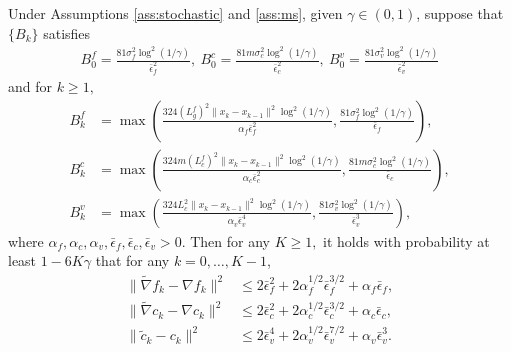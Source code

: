 \documentclass[10pt,a4paper]{amsart}
\newcommand{\be}{\begin{equation}}
\newcommand{\ee}{\end{equation}}
\begin{document}
\begin{lemma}\label{lem:gradient_estimator_recursive_lemma}
Under Assumptions \ref{ass:stochastic} and \ref{ass:ms}, given \(\gamma \in (0,1)\), suppose that $\{B_k\}$ satisfies 
\begin{align}\label{rm_b0}
    B_0^f =  \frac{81\sigma_f^2\log^2(1 /\gamma)}{\bar \epsilon_f^2},~ B_0^c =  \frac{{81m\sigma_c^2\log^2(1 /\gamma)}}{\bar \epsilon_c^2},~ B_0^v =  \frac{81\sigma_v^2\log^2(1 /\gamma)}{\bar \epsilon_v^2} 
\end{align}
and for $k\ge1,$
\be\label{batch-rm}\begin{aligned}
    B_k^f &= \max \left(\frac{324(L_g^f)^2\|x_k - x_{k-1}\|^2\log^2(1/\gamma)}{\alpha_f\bar \epsilon_f^2},\frac{81\sigma_f^2\log^2(1/\gamma)}{\bar \epsilon_f}\right) , \\
    B_k^c &= \max \left(\frac{{324 m (L_c^f)^2\|x_k - x_{k-1}\|^2\log^2(1/\gamma)}}{\alpha_c\bar \epsilon_c^2},\frac{{81m\sigma_c^2\log^2(1/\gamma)}}{\bar \epsilon_c}\right) , \\
    B_k^v &= \max \left(\frac{324 L_c^2\|x_k - x_{k-1}\|^2\log^2(1/\gamma)}{\alpha_v\bar \epsilon_v^4},\frac{81\sigma_v^2\log^2(1/\gamma)}{\bar \epsilon_v^3}\right) ,
\end{aligned}\ee
where $\alpha_f,\alpha_c,\alpha_v,\bar \epsilon_f,\bar \epsilon_c,\bar \epsilon_v>0$. Then for any $K\ge 1,$ it holds with probability at least $1-6K\gamma$ that for any \(k=0,\ldots, K-1\),
    \be\label{hig-err}\begin{aligned}
        \|\tilde \nabla f_k - \nabla f_k\|^2 &\leq 2\bar \epsilon_f^2+2\alpha_f^{1/2}\bar \epsilon_f^{3/2}+\alpha_f\bar \epsilon_f,\\
        \|\tilde \nabla c_k - \nabla c_k\|^2 &\leq 2\bar \epsilon_c^2+2\alpha_c^{1/2}\bar \epsilon_c^{3/2}+\alpha_c\bar \epsilon_c,\\
        \|\tilde c_k - c_k\|^2 &\leq 2\bar \epsilon_v^4+2\alpha_v^{1/2}\bar \epsilon_v^{7/2}+\alpha_v\bar \epsilon_v^3.
    \end{aligned}\ee
\end{lemma}
\end{document}
